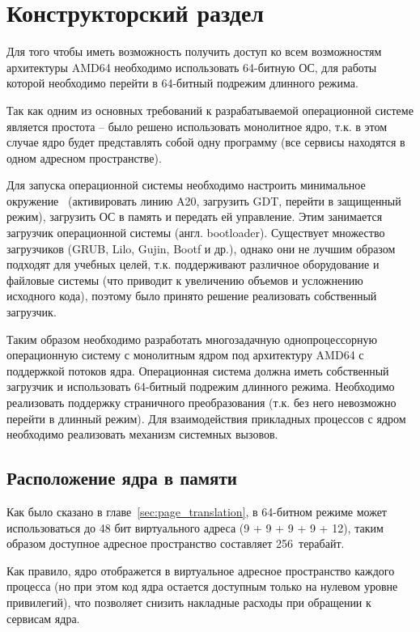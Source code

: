 \chapter{Конструкторский раздел}
\label{cha:design}

Для того чтобы иметь возможность получить доступ ко всем возможностям архитектуры AMD64
необходимо использовать 64-битную ОС, для работы которой необходимо перейти в 64-битный
подрежим длинного режима.

Так как одним из основных требований к разрабатываемой операционной системе
является простота -- было решено использовать монолитное ядро, т.к. в этом
случае ядро будет представлять собой одну программу (все сервисы находятся в
одном адресном пространстве).

Для запуска операционной системы необходимо настроить минимальное окружение~\cite{mstu_os_dev_method} (активировать линию A20,
загрузить GDT, перейти в защищенный режим), загрузить ОС в память и передать ей управление.
Этим занимается загрузчик операционной системы (англ. bootloader). Существует множество загрузчиков
(GRUB, Lilo, Gujin, Bootf и др.), однако они не лучшим образом подходят для учебных целей, т.к. поддерживают
различное оборудование и файловые системы (что приводит к увеличению объемов и усложнению исходного кода),
поэтому было принято решение реализовать собственный загрузчик.

Таким образом необходимо разработать многозадачную однопроцессорную операционную систему с
монолитным ядром под архитектуру AMD64 с поддержкой потоков ядра. Операционная система должна
иметь собственный загрузчик и использовать 64-битный подрежим длинного режима. Необходимо
реализовать поддержку страничного преобразования (т.к. без него невозможно перейти в длинный режим).
Для взаимодействия прикладных процессов с ядром необходимо реализовать механизм системных вызовов.


\section{Расположение ядра в памяти}
Как было сказано в главе~\ref{sec:page_translation}, в 64-битном режиме может использоваться
до 48 бит виртуального адреса (9 + 9 + 9 + 9 + 12), таким образом доступное адресное пространство
составляет 256~терабайт.

Как правило, ядро отображется в виртуальное адресное пространство каждого процесса (но при этом код ядра
остается доступным только на нулевом уровне привилегий), что позволяет снизить накладные расходы при
обращении к сервисам ядра.

